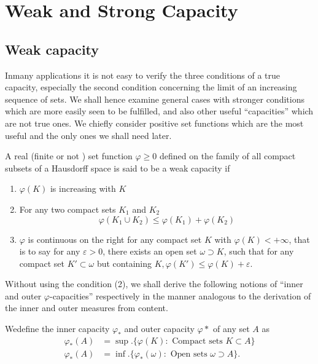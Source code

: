 \setcounter{chapter}{1}
\chapter{Weak and Strong Capacity}\label{p2:chap2}

\setcounter{section}{1}
\section{Weak capacity}\label{p2:chap2:sec2}%

In\pageoriginale many applications it is not easy to verify the three
conditions of 
a true capacity, especially the second condition concerning the limit
of an increasing sequence of sets. We shall hence examine general
cases with stronger conditions which are more easily seen to be
fulfilled, and also other useful ``capacities'' which are not true
ones. We chiefly consider positive set functions which are the most
useful and the only ones we shall need later. 

\setcounter{defn}{3}
\begin{defn}\label{p2:chap2:sec2:def3}%
  A real (finite or not ) set function $\varphi \geq 0$ defined on the
  family of all compact subsets of a Hausdorff space is said to be a
  weak capacity if  
  \begin{enumerate}[\rm (1)]
  \item $\varphi(K)$ is increasing with $K$
  \item For  any two compact sets $K_1$ and $K_2$
    $$
    \varphi(K_1 \cup K_2) \leq \varphi(K_1) + \varphi(K_2)
    $$
  \item $\varphi$ is continuous on the right for any compact set $K$
    with $\varphi (K) < + \infty$, that is to say for any $\varepsilon
    >0$, there exists an open set $\omega \supset K$, such that for
    any compact set $K' \subset \omega$ but containing $K, \varphi
    (K') \leq \varphi (K) + \varepsilon$.  
  \end{enumerate}
\end{defn}

Without using the condition (2), we shall derive the following
notions of ``inner and outer $\varphi$-capacities'' respectively in the
manner analogous to the derivation of the inner and outer measures
from content. 

We\pageoriginale define the inner capacity $\varphi_*$ and outer capacity $\varphi*$
of any set $A$ as  
\begin{align*}
  \varphi_* (A) &= \sup. \{ \varphi(K): \text{ Compact sets } K
  \subset A \}\\ 
  \varphi_* (A) &= \inf. \{\varphi_{*}(\omega) : \text{ Open sets }
  \omega \supset A \}. 
\end{align*}

